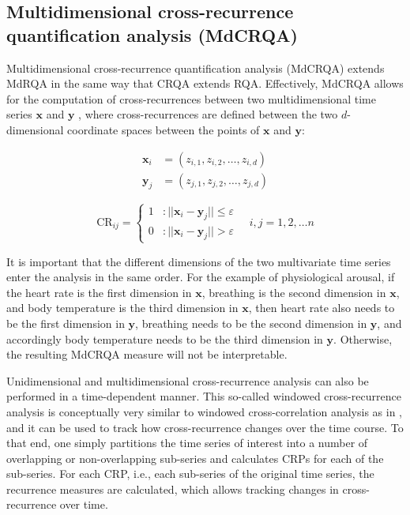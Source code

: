 \subsection{Multidimensional cross-recurrence quantification analysis (MdCRQA)}
\label{sec:mdcrqa}

Multidimensional cross-recurrence quantification analysis (MdCRQA) extends MdRQA in the same way that CRQA extends RQA. Effectively, MdCRQA allows for the computation of cross-recurrences between two multidimensional time series $\mathbf{x}$ and $\mathbf{y}$ \citep{wallot2019multidimensional}, where cross-recurrences are defined between the two $d$-dimensional coordinate spaces between the points of $\mathbf{x}$ and $\mathbf{y}$:

\begin{align}
    \mathbf{x}_i &= (z_{i,1}, z_{i,2}, \ldots , z_{i,d}) \\
    \mathbf{y}_j &= (z_{j,1}, z_{j,2}, \ldots , z_{j,d}) 
\end{align}

\begin{equation}
    \mathrm{CR}_{ij} = \left\{
  \begin{array}{lr}
    1 & : \vert\vert \mathbf{x}_i - \mathbf{y}_j \vert\vert \leq \varepsilon \\
    0 & : \vert\vert \mathbf{x}_i - \mathbf{y}_j \vert\vert > \varepsilon
  \end{array}
\right.
\quad
i,j = 1,2, \ldots n
\end{equation}

It is important that the different dimensions of the two multivariate time series enter the analysis in the same order. For the example of physiological arousal, if the heart rate is the first dimension in $\mathbf{x}$, breathing is the second dimension in $\mathbf{x}$, and body temperature is the third dimension in $\mathbf{x}$, then heart rate also needs to be the first dimension in $\mathbf{y}$, breathing needs to be the second dimension in $\mathbf{y}$, and accordingly body temperature needs to be the third dimension in $\mathbf{y}$. Otherwise, the resulting MdCRQA measure will not be interpretable.

Unidimensional and  multidimensional cross-recurrence analysis can also be performed in a time-dependent manner. This so-called windowed cross-recurrence analysis is conceptually very similar to windowed cross-correlation analysis as in \citet{boker2002windowed}, and it can be used to track how cross-recurrence changes over the time course. To that end, one simply partitions the time series of interest into a number of overlapping or non-overlapping sub-series and calculates CRPs for each of the sub-series. For each CRP, i.e., each sub-series of the original time series, the recurrence measures are calculated, which allows tracking changes in cross-recurrence over time.

